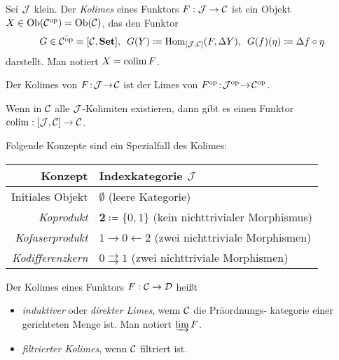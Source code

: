 \documentclass{cheat-sheet}
\begin{document}

\begin{defn}
  Sei $\mathcal{J}$ klein.
  Der \emph{Kolimes} eines Funktors $F : \mathcal{J} \to \mathcal{C}$ ist ein Objekt $X \in \operatorname{Ob}(\mathcal{C}^{\mathrm{op}}) = \operatorname{Ob}(\mathcal{C})$, das den Funktor
  \[
    G \in \hat{\mathcal{C}^{\mathrm{op}}} = [\mathcal{C}, \mathbf{Set}], \enspace
    G(Y) \coloneqq \operatorname{Hom}_{[\mathcal{J}, \mathcal{C}]}(F, \Delta Y), \enspace
    G(f)(\eta) \coloneqq \Delta f \circ \eta
  \]
  darstellt. Man notiert $X = \operatorname{colim} F$.
\end{defn}

\begin{bem}
  Der Kolimes von $F \!:\! \mathcal{J} \!\to\! \mathcal{C}$ ist der Limes von $F^{\mathrm{op}} \!:\! \mathcal{J}^{\mathrm{op}} \!\to\! \mathcal{C}^{\mathrm{op}}$.
\end{bem}

\begin{bem}
  Wenn in $\mathcal{C}$ alle $\mathcal{J}$-Kolimiten existieren, dann gibt es einen Funktor $\operatorname{colim} : [\mathcal{J}, \mathcal{C}] \to \mathcal{C}$.
\end{bem}

\begin{bem}
  Folgende Konzepte sind ein Spezialfall des Kolimes:
  \begin{center}
    \begin{tabular}{ | r | l | }
      \hline
      Konzept & Indexkategorie $\mathcal{J}$ \\ \hline
      Initiales Objekt & $\emptyset$ (leere Kategorie) \\
      \emph{Koprodukt} & $\mathbf{2} \coloneqq \{ 0, 1 \}$ (kein nichttrivialer Morphismus) \\
      \emph{Kofaserprodukt} & $1 \to 0 \leftarrow 2$ (zwei nichttriviale Morphismen) \\
      \emph{Kodifferenzkern} &  $0 \rightrightarrows 1$ (zwei nichttriviale Morphismen) \\ \hline
    \end{tabular}
  \end{center}
\end{bem}

\begin{defn}
  Der Kolimes eines Funktors $F : \mathcal{C} \to \mathcal{D}$ heißt
  \begin{itemize}
    \item \emph{induktiver} oder \emph{direkter Limes}, wenn $\mathcal{C}$ die Präordnungs- kategorie einer gerichteten Menge ist. Man notiert $\varinjlim F$.
    \item \emph{filtrierter Kolimes}, wenn $\mathcal{C}$ filtriert ist.
  \end{itemize}
\end{defn}
\end{document}
